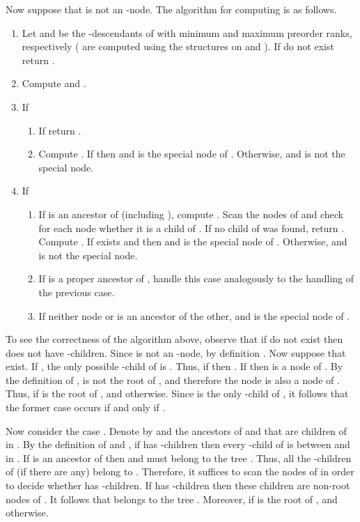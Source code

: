 \documentclass[12pt]{article}
\begin{document}
Now suppose that  is not an -node.
The algorithm for computing  is as follows.
\begin{enumerate}
\item
Let  and  be the -descendants of  with minimum and maximum
preorder ranks, respectively
( are computed using the structures on  and ).
If  do not exist return .
\item
Compute  and .
\item
If 
\begin{enumerate}
\item
If  return .
\item
Compute .
If  then
 and  is the special node of .
Otherwise,  and  is not the special node.
\label{alg:x-not-lca}
\end{enumerate}
\item
If 
\begin{enumerate}
\item
If  is an ancestor of  (including ), compute .
Scan the nodes of  and check for each node whether it is a child of .
If no child of  was found, return .
Compute . If  exists and 
then  and  is the special node of .
Otherwise,  and  is not the special node.
\item If  is a proper ancestor of , 
handle this case analogously to the handling of the previous case.
\item If neither node  or  is an ancestor of the other,
 and  is the special node of .
\end{enumerate}
\end{enumerate}
To see the correctness of the algorithm above, observe that
if  do not exist then  does not have -children.
Since  is not an -node, by definition .
Now suppose that  exist.
If , the only possible -child of  is .
Thus, if  then .
If  then  is a node of .
By the definition of ,  is not the root of ,
and therefore the node  is also a node of .
Thus,  if  is the root of , and
 otherwise.
Since  is the only -child of , it follows that the former case
occurs if and only if .

Now consider the case .
Denote by  and  the ancestors of  and  that are
children of  in .
By the definition of  and , if  has -children then
every -child  of  is between  and  in .
If   is an ancestor of  then  and  must belong to the
tree .
Thus, all the -children of  (if there are any) belong to .
Therefore, it suffices to scan the nodes of  in order to decide
whether  has -children.
If  has -children then these children are non-root nodes of .
It follows that  belongs to the tree .
Moreover,
 if  is the root of , and
 otherwise.
\end{document}
